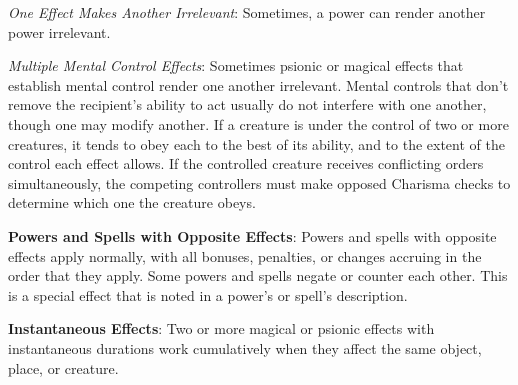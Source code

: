 \textit{One Effect Makes Another Irrelevant}: Sometimes, a power can render another power irrelevant.

\textit{Multiple Mental Control Effects}: Sometimes psionic or magical effects that establish mental control render one another irrelevant. Mental controls that don't remove the recipient's ability to act usually do not interfere with one another, though one may modify another. If a creature is under the control of two or more creatures, it tends to obey each to the best of its ability, and to the extent of the control each effect allows. If the controlled creature receives conflicting orders simultaneously, the competing controllers must make opposed Charisma checks to determine which one the creature obeys.

\textbf{Powers and Spells with Opposite Effects}: Powers and spells with opposite effects apply normally, with all bonuses, penalties, or changes accruing in the order that they apply. Some powers and spells negate or counter each other. This is a special effect that is noted in a power's or spell's description.

\textbf{Instantaneous Effects}: Two or more magical or psionic effects with instantaneous durations work cumulatively when they affect the same object, place, or creature.